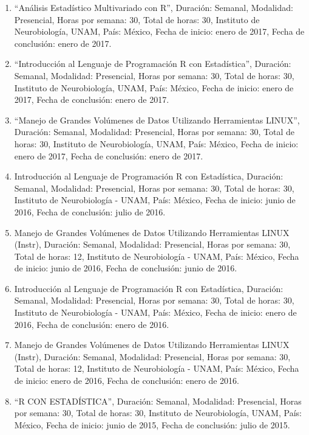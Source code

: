 \begin{enumerate}
\item “Análisis Estadístico Multivariado con R”, Duración: Semanal, Modalidad: Presencial, Horas por semana: 
30, 
Total de horas: 30, Instituto de Neurobiología, UNAM, País: México, Fecha de inicio: enero de 2017, Fecha de 
conclusión: enero de 2017.

\item “Introducción al Lenguaje de Programación R con Estadística”, Duración: Semanal, Modalidad: Presencial, 
Horas 
por semana: 30, Total de horas: 30, Instituto de Neurobiología, UNAM, País: México, Fecha de inicio: enero de 
2017, Fecha de conclusión: enero de 2017.

\item “Manejo de Grandes Volúmenes de Datos Utilizando Herramientas LINUX”, Duración: Semanal, Modalidad: 
Presencial, Horas por semana: 30, Total de horas: 30, Instituto de Neurobiología, UNAM, País: México, Fecha de 
inicio: enero de 2017, Fecha de conclusión: enero de 2017.

\item Introducción al Lenguaje de Programación R con Estadística, Duración: Semanal, Modalidad: Presencial, 
Horas 
por semana: 30, Total de horas: 30, Instituto de Neurobiología - UNAM, País: México, Fecha de inicio: junio de 
2016, Fecha de conclusión: julio de 2016.

\item Manejo de Grandes Volúmenes de Datos Utilizando Herramientas LINUX (Instr), Duración: Semanal, 
Modalidad: 
Presencial, Horas por semana: 30, Total de horas: 12, Instituto de Neurobiología - UNAM, País: México, Fecha 
de inicio: junio de 2016, Fecha de conclusión: junio de 2016.

\item Introducción al Lenguaje de Programación R con Estadística, Duración: Semanal, Modalidad: Presencial, 
Horas 
por semana: 30, Total de horas: 30, Instituto de Neurobiología - UNAM, País: México, Fecha de inicio: enero de 
2016, Fecha de conclusión: enero de 2016.

\item Manejo de Grandes Volúmenes de Datos Utilizando Herramientas LINUX (Instr), Duración: Semanal, 
Modalidad: 
Presencial, Horas por semana: 30, Total de horas: 12, Instituto de Neurobiología - UNAM, País: México, Fecha 
de inicio: enero de 2016, Fecha de conclusión: enero de 2016.

\item “R CON ESTADÍSTICA”, Duración: Semanal, Modalidad: Presencial, Horas por semana: 30, Total de horas: 30, 
Instituto de Neurobiología, UNAM, País: México, Fecha de inicio: junio de 2015, Fecha de conclusión: julio de 
2015.


\end{enumerate}
